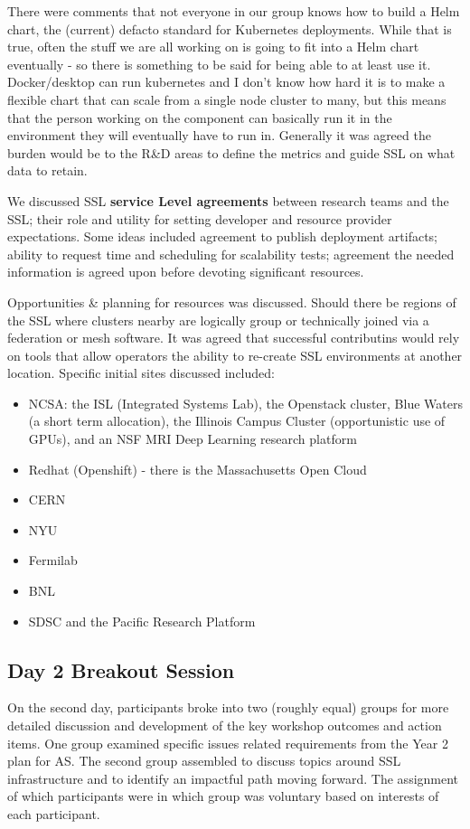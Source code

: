 \documentclass[11pt,letterpaper,fleqn]{article}
\begin{document}
There were comments that not everyone in our group knows how to build a Helm chart, the (current) defacto standard for Kubernetes deployments. While that is true, often the stuff we are all working on is going to fit into a Helm chart eventually - so there is something to be said for being able to at least use it. Docker/desktop can run kubernetes and I don’t know how hard it is to make a flexible chart that can scale from a single node cluster to many, but this means that the person working on the component can basically run it in the environment they will eventually have to run in. Generally it was agreed the burden would be to the R\&D areas to define the metrics and guide SSL on what data to retain.

We discussed SSL {\bf service Level agreements} between research teams and the SSL; their role and utility for setting developer and resource provider expectations.  Some ideas included agreement to publish deployment artifacts; ability to request time and scheduling for scalability tests;  agreement the needed information is agreed upon before devoting significant resources.

Opportunities \& planning for resources was discussed.  Should there be regions of the SSL where clusters nearby are logically group or technically joined via a federation or mesh software. It was agreed that successful contributins would rely on tools that allow operators the ability to re-create SSL environments at another location.  Specific initial sites discussed included:
\begin{itemize}
  \item NCSA: the ISL (Integrated Systems Lab), the Openstack cluster, Blue Waters (a short term allocation), the Illinois Campus Cluster (opportunistic use of GPUs), and an NSF MRI Deep Learning research platform
  \item Redhat (Openshift) - there is the Massachusetts Open Cloud
  \item CERN
  \item NYU
  \item Fermilab
  \item BNL
  \item SDSC and the Pacific Research Platform
\end{itemize}

\subsection{Day 2 Breakout Session}
On the second day, participants broke into two (roughly equal) groups for more detailed discussion and development of the key workshop outcomes and action items. One group examined specific issues related requirements from the Year 2 plan for AS. The second group assembled to discuss topics around SSL infrastructure and to identify an impactful path moving forward. The assignment of which participants were in which group was voluntary based on interests of each participant.
\end{document}
